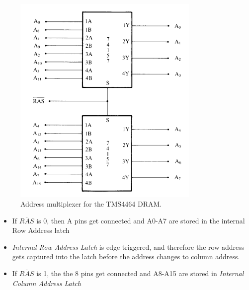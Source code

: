 \begin{figure}[h!]
  \centering
  \includegraphics[width = 0.8\textwidth]{./figures/RAS.png}
  \caption{Address multiplexer for the TMS4464 DRAM.}
  \label{}
\end{figure}
\begin{itemize}
  \item If $\overline{RAS}$ is 0, then A pins get connected and A0-A7 are stored in the internal Row Address latch
  \item \textit{Internal Row Address Latch} is edge triggered, and therefore the row address gets captured into the latch before the address changes to column address.
  \item If $\overline{RAS}$ is 1, the the 8 pins get connected and A8-A15 are stored in \textit{Internal Column Address Latch}
\end{itemize}
